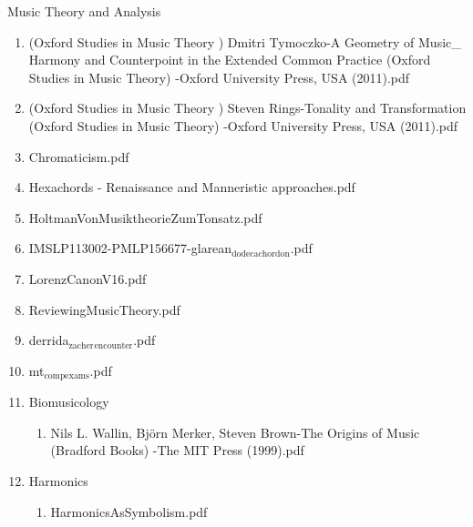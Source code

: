 \documentclass[11pt]{article}
\begin{document}
\item Music Theory and Analysis
\label{sec-1-1-1-1-31-12}
\begin{enumerate}
\item (Oxford Studies in Music Theory ) Dmitri Tymoczko-A Geometry of Music\_ Harmony and Counterpoint in the Extended Common Practice (Oxford Studies in Music Theory)  -Oxford University Press, USA (2011).pdf
\label{sec-1-1-1-1-31-12-1}

\item (Oxford Studies in Music Theory ) Steven Rings-Tonality and Transformation (Oxford Studies in Music Theory)  -Oxford University Press, USA (2011).pdf
\label{sec-1-1-1-1-31-12-2}

\item Chromaticism.pdf
\label{sec-1-1-1-1-31-12-3}

\item Hexachords - Renaissance and Manneristic approaches.pdf
\label{sec-1-1-1-1-31-12-4}

\item HoltmanVonMusiktheorieZumTonsatz.pdf
\label{sec-1-1-1-1-31-12-5}

\item IMSLP113002-PMLP156677-glarean$_{\text{dodecachordon}}$.pdf
\label{sec-1-1-1-1-31-12-6}

\item LorenzCanonV16.pdf
\label{sec-1-1-1-1-31-12-7}

\item ReviewingMusicTheory.pdf
\label{sec-1-1-1-1-31-12-8}

\item derrida$_{\text{zacher}}$$_{\text{encounter}}$.pdf
\label{sec-1-1-1-1-31-12-9}

\item mt$_{\text{compexams}}$.pdf
\label{sec-1-1-1-1-31-12-10}

\item Biomusicology
\label{sec-1-1-1-1-31-12-11}
\begin{enumerate}
\item Nils L. Wallin, Björn Merker, Steven Brown-The Origins of Music (Bradford Books)  -The MIT Press (1999).pdf
\label{sec-1-1-1-1-31-12-11-1}
\end{enumerate}

\item Harmonics
\label{sec-1-1-1-1-31-12-12}
\begin{enumerate}
\item HarmonicsAsSymbolism.pdf
\label{sec-1-1-1-1-31-12-12-1}


\end{enumerate}
\end{enumerate}
\end{document}
